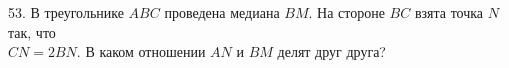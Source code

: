 53. В треугольнике $ABC$ проведена медиана $BM.$ На стороне $BC$ взята точка $N$ так, что\\ $CN=2BN.$ В каком отношении $AN$ и $BM$ делят друг друга?\\
